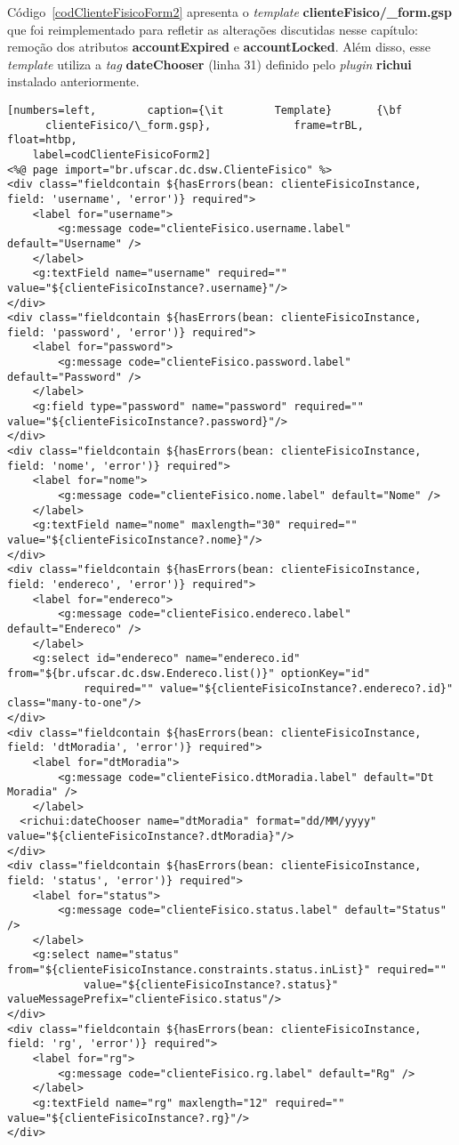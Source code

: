 \newpage

\noindent  Código~\ref{codClienteFisicoForm2} apresenta  o  {\it template}  {\bf
  clienteFisico/\_form.gsp} que  foi reimplementado para  refletir as alterações
discutidas  nesse capítulo: remoção  dos atributos  {\bf accountExpired}  e {\bf
  accountLocked}.   Além disso,  esse {\it  template} utiliza  a {\it  tag} {\bf
  dateChooser}  (linha 31)  definido pelo  {\it plugin}  {\bf  richui} instalado
anteriormente. 

\vspace{0.3cm}

\begin{lstlisting}[numbers=left,        caption={\it        Template}       {\bf
      clienteFisico/\_form.gsp},             frame=trBL,             float=htbp,
    label=codClienteFisicoForm2] 
<%@ page import="br.ufscar.dc.dsw.ClienteFisico" %>
<div class="fieldcontain ${hasErrors(bean: clienteFisicoInstance, field: 'username', 'error')} required">
	<label for="username">
		<g:message code="clienteFisico.username.label" default="Username" />
	</label>
	<g:textField name="username" required="" value="${clienteFisicoInstance?.username}"/>
</div>
<div class="fieldcontain ${hasErrors(bean: clienteFisicoInstance, field: 'password', 'error')} required">
	<label for="password">
		<g:message code="clienteFisico.password.label" default="Password" />
	</label>
	<g:field type="password" name="password" required="" value="${clienteFisicoInstance?.password}"/>
</div>
<div class="fieldcontain ${hasErrors(bean: clienteFisicoInstance, field: 'nome', 'error')} required">
	<label for="nome">
		<g:message code="clienteFisico.nome.label" default="Nome" />
	</label>
	<g:textField name="nome" maxlength="30" required="" value="${clienteFisicoInstance?.nome}"/>
</div>
<div class="fieldcontain ${hasErrors(bean: clienteFisicoInstance, field: 'endereco', 'error')} required">
	<label for="endereco">
		<g:message code="clienteFisico.endereco.label" default="Endereco" />
	</label>
	<g:select id="endereco" name="endereco.id" from="${br.ufscar.dc.dsw.Endereco.list()}" optionKey="id" 
            required="" value="${clienteFisicoInstance?.endereco?.id}" class="many-to-one"/>
</div>
<div class="fieldcontain ${hasErrors(bean: clienteFisicoInstance, field: 'dtMoradia', 'error')} required">
	<label for="dtMoradia">
		<g:message code="clienteFisico.dtMoradia.label" default="Dt Moradia" />
	</label>
  <richui:dateChooser name="dtMoradia" format="dd/MM/yyyy" value="${clienteFisicoInstance?.dtMoradia}"/>
</div>
<div class="fieldcontain ${hasErrors(bean: clienteFisicoInstance, field: 'status', 'error')} required">
	<label for="status">
		<g:message code="clienteFisico.status.label" default="Status" />
	</label>
	<g:select name="status" from="${clienteFisicoInstance.constraints.status.inList}" required="" 
            value="${clienteFisicoInstance?.status}" valueMessagePrefix="clienteFisico.status"/>
</div>
<div class="fieldcontain ${hasErrors(bean: clienteFisicoInstance, field: 'rg', 'error')} required">
	<label for="rg">
		<g:message code="clienteFisico.rg.label" default="Rg" />
	</label>
	<g:textField name="rg" maxlength="12" required="" value="${clienteFisicoInstance?.rg}"/>
</div>


\end{lstlisting}
